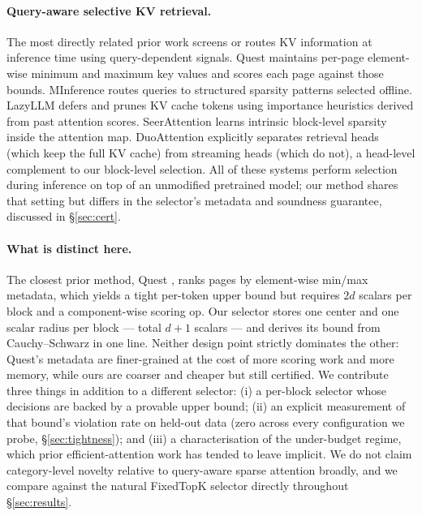 \documentclass[11pt]{article}
\theoremstyle{plain}
\theoremstyle{definition}
\begin{document}
\paragraph{Query-aware selective KV retrieval.}
The most directly related prior work screens or routes KV information at
inference time using query-dependent signals. Quest \citep{tang2024quest}
maintains per-page element-wise minimum and maximum key values and scores
each page against those bounds. MInference \citep{jiang2024minference}
routes queries to structured sparsity patterns selected offline.
LazyLLM \citep{fu2024lazyllm} defers and prunes KV cache tokens using
importance heuristics derived from past attention scores. SeerAttention
\citep{gao2024seer} learns intrinsic block-level sparsity inside the
attention map. DuoAttention \citep{xiao2024duoattention} explicitly
separates retrieval heads (which keep the full KV cache) from streaming
heads (which do not), a head-level complement to our block-level
selection. All of these systems perform selection during inference on top
of an unmodified pretrained model; our method shares that setting but
differs in the selector's metadata and soundness guarantee, discussed in
\S\ref{sec:cert}.

\paragraph{What is distinct here.}
The closest prior method, Quest \citep{tang2024quest}, ranks pages by
element-wise min/max metadata, which yields a tight per-token upper bound
but requires $2d$ scalars per block and a component-wise scoring op. Our
selector stores one center and one scalar radius per block --- total
$d{+}1$ scalars --- and derives its bound from Cauchy--Schwarz in one
line. Neither design point strictly dominates the other: Quest's metadata
are finer-grained at the cost of more scoring work and more memory, while
ours are coarser and cheaper but still certified. We contribute three
things in addition to a different selector: (i) a per-block selector whose
decisions are backed by a provable upper bound; (ii) an explicit
measurement of that bound's violation rate on held-out data (zero across
every configuration we probe, \S\ref{sec:tightness}); and (iii) a
characterisation of the under-budget regime, which prior efficient-attention
work has tended to leave implicit. We do not claim category-level novelty
relative to query-aware sparse attention broadly, and we compare against
the natural FixedTopK selector directly throughout
\S\ref{sec:results}.
\end{document}
